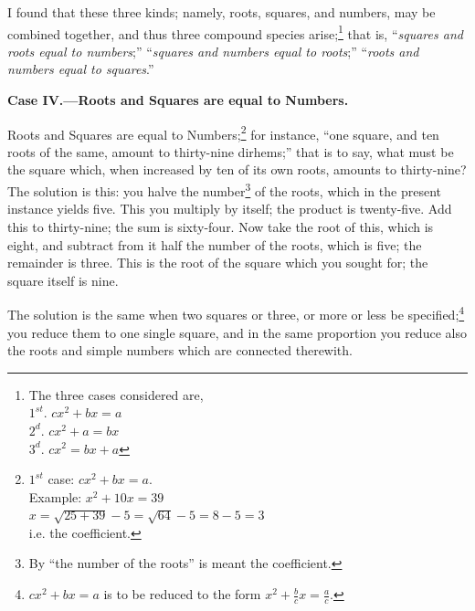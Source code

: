 \vspace{0.5cm}
I found that these three kinds; namely, roots, squares, and numbers, may be combined together, and thus three compound species arise;\footnote{The three cases considered are,\\\null\hspace{1cm}$1^{st}$. $cx^2 + bx = a$\\\null\hspace{1cm}$2^{d}$. $cx^2 + a = bx$\\\null\hspace{1cm}$3^{d}$. $cx^2 = bx + a$} that is, ``\textit{squares and roots equal to numbers};'' ``\textit{squares and numbers equal to roots};'' ``\textit{roots and numbers equal to squares}.''

\vspace{0.3cm}
\noindent\textbf{Case IV.---Roots and Squares are equal to Numbers.}

Roots and Squares are equal to Numbers;\footnote{$1^{st}$ case: $cx^2 + bx = a$.\\Example: $x^2 + 10x = 39$\\$x = \sqrt{25 + 39} - 5 = \sqrt{64} - 5 = 8 - 5 = 3$\\i.e. the coefficient.} for instance, ``one square, and ten roots of the same, amount to thirty-nine dirhems;'' that is to say, what must be the square which, when increased by ten of its own roots, amounts to thirty-nine? The solution is this: you halve the number\footnote{By ``the number of the roots'' is meant the coefficient.} of the roots, which in the present instance yields five. This you multiply by itself; the product is twenty-five. Add this to thirty-nine; the sum is sixty-four. Now take the root of this, which is eight, and subtract from it half the number of the roots, which is five; the remainder is three. This is the root of the square which you sought for; the square itself is nine.

The solution is the same when two squares or three, or more or less be specified;\footnote{$cx^2 + bx = a$ is to be reduced to the form $x^2 + \frac{b}{c}x = \frac{a}{c}$.} you reduce them to one single square, and in the same proportion you reduce also the roots and simple numbers which are connected therewith.

